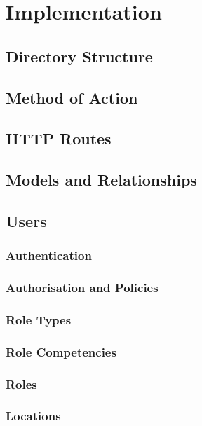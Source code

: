 \chapter{Implementation}

\section{Directory Structure}

\section{Method of Action}

\section{HTTP Routes}

\section{Models and Relationships}

\section{Users}

\subsection{Authentication}

\subsection{Authorisation and Policies}

\subsection{Role Types}

\subsection{Role Competencies}

\subsection{Roles}

\subsection{Locations}

